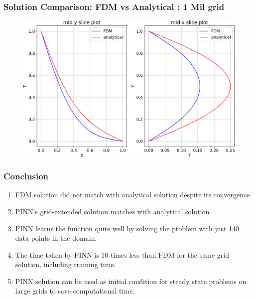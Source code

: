 \begin{frame}
    \frametitle{Solution Comparison: FDM vs Analytical : 1 Mil grid}
    \begin{figure}
        \includegraphics[scale=0.4]{supportingFiles/plots_FDM.png}
    \end{figure}
\end{frame}


\begin{frame}
    \frametitle{Conclusion}
    \begin{enumerate}
        \item FDM solution did not match with analytical solution despite its
            convergence.
            \vspace{0.5cm}
        \item PINN's grid-extended solution matches with analytical solution.
            \vspace{0.5cm}
        \item PINN learns the function quite well by solving the problem with
            just 140 data points in the domain.
            \vspace{0.5cm}
        \item The time taken by PINN is 10 times less than FDM for the same
            grid solution, including training time.
            \vspace{0.5cm}
        \item PINN solution can be used as initial condition for steady state
            problems on large grids to save computational time.
    \end{enumerate}
\end{frame}
